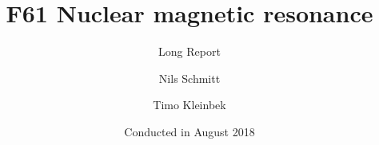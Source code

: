 \documentclass[12pt,
				 a4paper,
				numbers=endperiod
				 ]{scrartcl}
\title{F61 Nuclear magnetic resonance}
\subtitle{Long Report}
\author{Nils Schmitt \and Timo Kleinbek}
\date{Conducted in August 2018}
\begin{document}
\maketitle

\tableofcontents



\nocite{*}
\printbibliography
\end{document}
